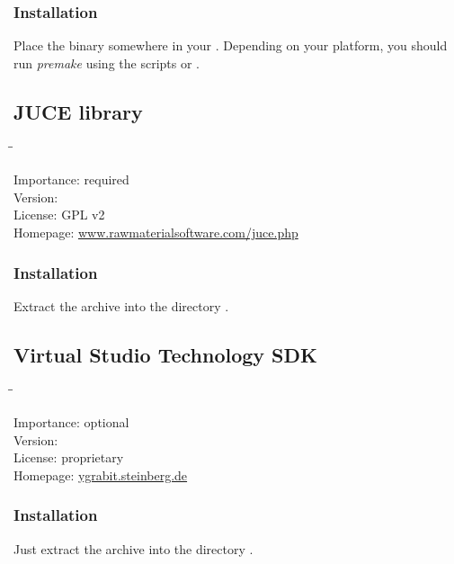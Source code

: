 \subsubsection{Installation}

Place the binary somewhere in your .  Depending on your
platform, you should run \emph{premake} using the scripts
 or .

\subsection{JUCE library}

\begin{tabbing}
  \hspace*{6em}\=\=\kill

  Importance:  \> required \\
  Version:      \\
  License:     \> GPL v2 \\
  Homepage:    \> \href{http://www.rawmaterialsoftware.com/juce.php}{www.rawmaterialsoftware.com/juce.php}
\end{tabbing}

\subsubsection{Installation}

Extract the archive into the directory .

\subsection{Virtual Studio Technology SDK}

\begin{tabbing}
  \hspace*{6em}\=\=\kill

  Importance:  \> optional \\
  Version:      \\
  License:     \> proprietary \\
  Homepage:    \> \href{http://ygrabit.steinberg.de/}{ygrabit.steinberg.de}
\end{tabbing}

\subsubsection{Installation}

Just extract the archive into the directory
.


